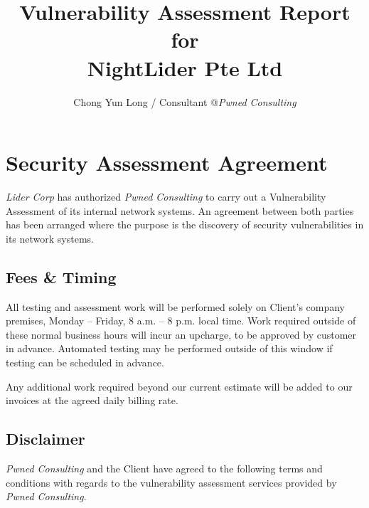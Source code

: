 \documentclass{article}[12 pt,a4paper]
\title{Vulnerability Assessment Report  for\\
NightLider Pte Ltd}
\date{Chong Yun Long / Consultant @{\emph{Pwned Consulting}}}
\begin{document}
\maketitle
\newpage 
\tableofcontents
\newpage 



%     
% 
% 


\section{Security Assessment Agreement}

\emph{Lider Corp} has authorized \emph{Pwned Consulting} to carry out a Vulnerability Assessment of its internal network systems.
An agreement between both parties has been arranged where the purpose is the discovery of security vulnerabilities in its network systems. 

\subsection{Fees \& Timing}
All testing and assessment work will be performed solely on Client's company premises, Monday -- Friday, 8 a.m. -- 8 p.m. local time. Work required outside of these normal business hours will incur an upcharge, to be approved by customer in advance. Automated testing may be performed outside of this window if testing can be scheduled in advance.

Any additional work required beyond our current estimate will be added to our invoices at the agreed daily billing rate.

\subsection{Disclaimer}

\emph{Pwned Consulting} and the Client have agreed to the following terms and conditions with regards to the vulnerability assessment services provided by \emph{Pwned Consulting}.
\end{document}
